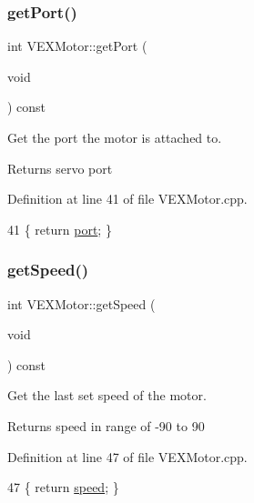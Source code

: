 \subsubsection{\texorpdfstring{get\+Port()}{getPort()}}
{\footnotesize\ttfamily int V\+E\+X\+Motor\+::get\+Port (\begin{DoxyParamCaption}\item[{void}]{ }\end{DoxyParamCaption}) const}



Get the port the motor is attached to. 

\begin{DoxyReturn}{Returns}
servo port 
\end{DoxyReturn}


Definition at line 41 of file V\+E\+X\+Motor.\+cpp.


\begin{DoxyCode}
41 \{ \textcolor{keywordflow}{return} \hyperlink{class_v_e_x_motor_a4d116557bd4fd7149a498980369bace5}{port}; \}
\end{DoxyCode}
\mbox{\label{class_v_e_x_motor_aa4b9bf46160a8fe41fd05910dab5db54}} 
\subsubsection{\texorpdfstring{get\+Speed()}{getSpeed()}}
{\footnotesize\ttfamily int V\+E\+X\+Motor\+::get\+Speed (\begin{DoxyParamCaption}\item[{void}]{ }\end{DoxyParamCaption}) const}



Get the last set speed of the motor. 

\begin{DoxyReturn}{Returns}
speed in range of -\/90 to 90 
\end{DoxyReturn}


Definition at line 47 of file V\+E\+X\+Motor.\+cpp.


\begin{DoxyCode}
47 \{ \textcolor{keywordflow}{return} \hyperlink{class_v_e_x_motor_a6ab8752bef90d706c107826a436afa24}{speed}; \}
\end{DoxyCode}
\mbox{\label{class_v_e_x_motor_a2c4c51b0b9c1c6747e0a8f1cee9f39e3}} 
